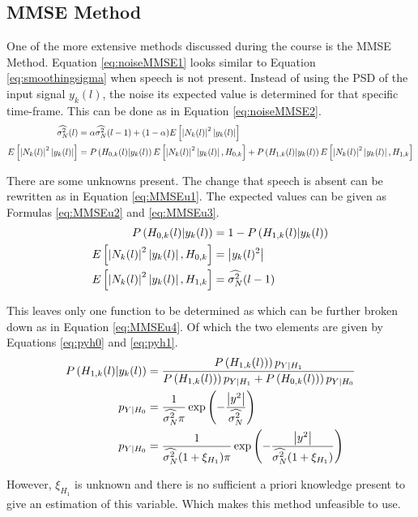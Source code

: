 \subsection{MMSE Method}
One of the more extensive methods discussed during the course is the MMSE Method. Equation \ref{eq:noiseMMSE1} looks similar to Equation \ref{eq:smoothingsigma} when speech is not present. Instead of using the PSD of the input signal $y_k(l)$, the noise its expected value is determined for that specific time-frame. This can be done as in Equation \ref{eq:noiseMMSE2}.
\begin{align}
  \widehat{\sigma_{N}^{2}}(l) &= \alpha \widehat{\sigma_{N}^{2}}(l-1) + (1-\alpha)E\left[ \abs{N_{k}(l)}^{2}\abs{y_{k}(l)}\right]
  \label{eq:noiseMMSE1} \\
  E\left[ \abs{N_{k}(l)}^{2}\abs{y_{k}(l)}\right] &=
  P\left(H_{0,k}(l)|y_{k}(l)\right) E\left[\abs{N_{k}(l)}^{2}\abs{y_{k}(l)},H_{0,k}\right] +
  P\left(H_{1,k}(l)|y_{k}(l)\right) E\left[\abs{N_{k}(l)}^{2}\abs{y_{k}(l)},H_{1,k}\right]
  \label{eq:noiseMMSE2}
\end{align}

There are some unknowns present. The change that speech is absent can be rewritten as in Equation \ref{eq:MMSEu1}. The expected values can be given as Formulas \ref{eq:MMSEu2} and \ref{eq:MMSEu3}.
\begin{align}
  P\left(H_{0,k}(l)|y_{k}(l)\right) &= 1 - P\left(H_{1,k}(l)|y_{k}(l)\right)
  \label{eq:MMSEu1} \\
  E\left[\abs{N_{k}(l)}^{2}\abs{y_{k}(l)},H_{0,k}\right] &= \abs{y_{k}(l)^{2}}
  \label{eq:MMSEu2} \\
  E\left[\abs{N_{k}(l)}^{2}\abs{y_{k}(l)},H_{1,k}\right] &= \widehat{\sigma_{N}^{2}}(l-1)
  \label{eq:MMSEu3}
\end{align}

This leaves only one function to be determined as which can be further broken down as in Equation \ref{eq:MMSEu4}. Of which the two elements are given by Equations \ref{eq:pyh0} and \ref{eq:pyh1}.
\begin{align}
  P\left(H_{1,k}(l)|y_{k}(l)\right) &= \frac{P\left(H_{1,k}(l))\right)p_{Y|H_{1}}}{P\left(H_{1,k}(l))\right)p_{Y|H_{1}} + P\left(H_{0,k}(l))\right)p_{Y|H_{0}}}
  \label{eq:MMSEu4}\\
  p_{Y|H_{0}} &= \frac{1}{\widehat{\sigma_{N}^{2}} \pi} \exp\left(-\frac{\abs{y^{2}}}{\widehat{\sigma_{N}^{2}}}\right)
  \label{eq:pyh0}\\
  p_{Y|H_{0}} &= \frac{1}{\widehat{\sigma_{N}^{2}} (1+\xi_{H_{1}})\pi} \exp\left(-\frac{\abs{y^{2}}}{\widehat{\sigma_{N}^{2}}(1+\xi_{H_{1}})}\right)
  \label{eq:pyh1}
\end{align}

However, $\xi_{H_{1}}$ is unknown and there is no sufficient a priori knowledge present to give an estimation of this variable. Which makes this method unfeasible to use.

